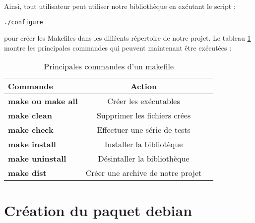 Ainsi, tout utilisateur peut utiliser notre biblioth\`eque en ex\'cutant le script :
\begin{verbatim}./configure\end{verbatim}
pour cr\'eer les Makefiles dans les diff\'rents r\'epertoire de notre projet.
Le tableau \ref{tab:commandes} montre les principales commandes qui peuvent maintenant \^etre ex\'ecut\'ees :
\begin{table}[h]
\begin{center}

\begin{tabular}{|l|c|r|}
  \hline
  Commande &  Action\\
  \hline
  \textbf{make ou make all} & Cr\'eer les ex\'ecutables \\
  \textbf{make clean} & Supprimer les fichiers cr\'ees\\
  \textbf{make check} & Effectuer une s\'erie de tests \\
  \textbf{make install} & Installer la bibliot\`eque \\
  \textbf{make uninstall} & D\'esintaller la biblioth\`eque \\
  \textbf{make dist} & Cr\'eer une archive de notre projet \\
  \hline
\end{tabular}
\caption{Principales commandes d'un makefile}
\end{center}
\label{tab:commandes}
\end{table}

\section{Cr\'eation du paquet debian}










